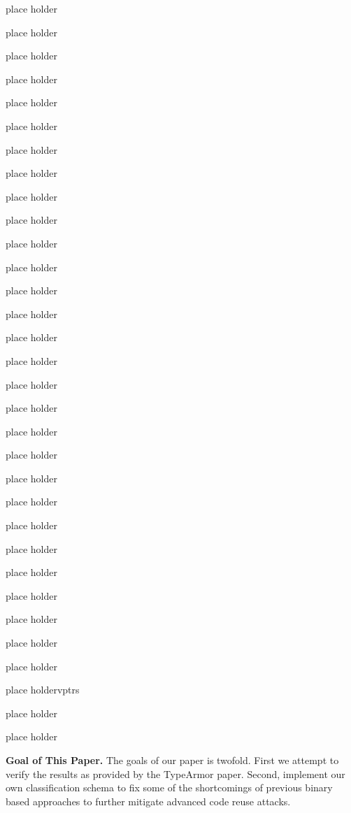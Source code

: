 place holder

place holder

place holder

place holder

place holder

place holder

place holder

place holder

place holder

place holder

place holder

place holder

place holder

place holder

place holder

place holder

place holder

place holder

place holder

place holder

place holder

place holder

place holder

place holder

place holder

place holder

place holder

place holder

place holder

place holdervptrs

place holder

place holder


\textbf{Goal of This Paper.} The goals of our paper is twofold. First we attempt to verify 
the results as provided by the TypeArmor paper. 
Second, implement our own classification schema to fix some of the shortcomings of previous 
binary based approaches 
to further mitigate advanced code reuse attacks.

